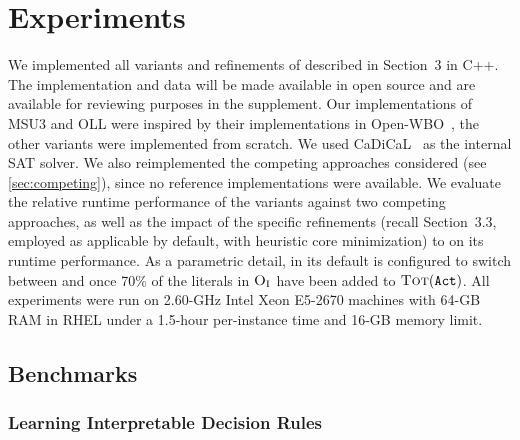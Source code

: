 \chapter{Experiments\label{chap:experiments}}

We implemented  all variants and refinements of \algname{} described in Section~3 in C++.
The implementation and data will be made available in open source and are available for reviewing purposes in the supplement.
Our implementations of MSU3 and OLL were inspired by their implementations in Open-WBO~\autocite{DBLP:conf/sat/MartinsML14}, the other variants were implemented from scratch.
We used CaDiCaL~\autocite{BiereFazekasFleuryHeisinger-SAT-Competition-2020-solvers} as the internal SAT solver.
We also reimplemented the competing approaches considered (see \cref{sec:competing}), since no reference implementations were available.
We evaluate the relative runtime performance of the \algname{} variants against two competing approaches, as well as the impact of the specific refinements (recall Section~3.3, employed as applicable by default, with heuristic core minimization) to \algname{} on its runtime performance.
As a parametric detail, in its default \msh{} is configured to switch between \msu{} and \satunsat{} once 70\% of the literals in $\textsc{O}_{\text{I}}$ have been added to $\textsc{Tot}(\texttt{Act})$.
All experiments were run on 2.60-GHz Intel Xeon E5-2670 machines with 64-GB RAM in RHEL under a 1.5-hour per-instance time and 16-GB memory limit. 

\section{Benchmarks\label{sec:benchmarks}}

\subsection{Learning Interpretable Decision Rules\label{sec:lidr}}

